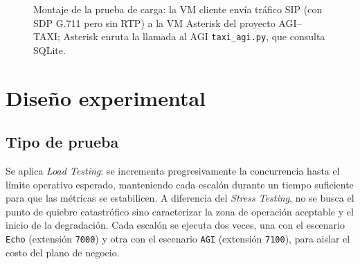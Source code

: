\documentclass[conference]{IEEEtran}
\begin{document}
\begin{figure}[!t]
\centering
{}
\caption{Montaje de la prueba de carga: la VM cliente env\'ia tr\'afico SIP (con SDP G.711 pero sin RTP) a la VM Asterisk del proyecto AGI--TAXI; Asterisk enruta la llamada al AGI \texttt{taxi\_agi.py}, que consulta SQLite.}
\label{fig:arquitectura}
\end{figure}

\section{Dise\~no experimental}

\subsection{Tipo de prueba}

Se aplica \textit{Load Testing}: se incrementa progresivamente la
concurrencia hasta el l\'imite operativo esperado, manteniendo cada
escal\'on durante un tiempo suficiente para que las m\'etricas se
estabilicen. A diferencia del \textit{Stress Testing}, no se busca el
punto de quiebre catastr\'ofico sino caracterizar la zona de
operaci\'on aceptable y el inicio de la degradaci\'on. Cada escal\'on
se ejecuta dos veces, una con el escenario \texttt{Echo} (extensi\'on
\texttt{7000}) y otra con el escenario \texttt{AGI} (extensi\'on
\texttt{7100}), para aislar el costo del plano de negocio.
\end{document}
